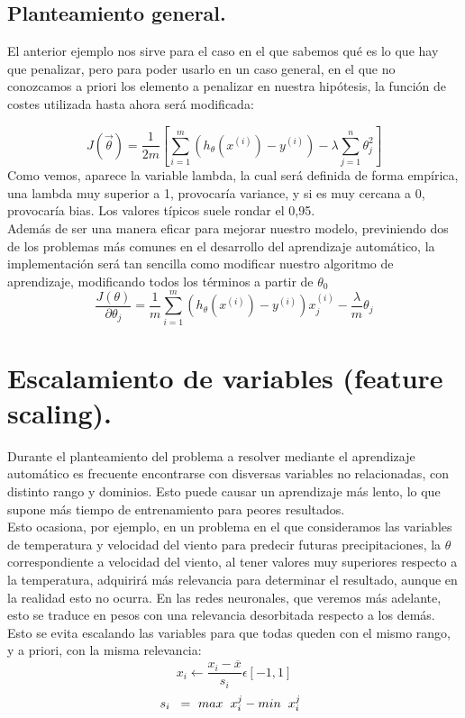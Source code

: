 \documentclass[a4paper,10pt]{article}
\begin{document}
\subsection{Planteamiento general.}
\noindent
El anterior ejemplo nos sirve para el caso en el que sabemos qué es lo que hay que penalizar, pero para poder usarlo en un caso general, en el que no conozcamos a priori los elemento a penalizar en nuestra hipótesis, la función de costes utilizada hasta ahora será modificada:

\[
J(\vec{\theta})=\frac{1}{2m}\left[\sum_{i=1}^{m} \left(h_\theta (x^{(i)})-y^{(i)}\right)-\lambda \sum_{j=1}^{n}\theta_{j}^2\right]
\]
Como vemos, aparece la variable lambda, la cual será definida de forma empírica, una lambda muy superior a 1, provocaría variance, y si es muy cercana a 0, provocaría bias. Los valores típicos suele rondar el 0,95.\\
Además de ser una manera eficar para mejorar nuestro modelo, previniendo dos de los problemas más comunes en el desarrollo del aprendizaje automático, la implementación será tan sencilla como modificar nuestro algoritmo de aprendizaje, modificando todos los términos a partir de $\theta_0$ \\
\[
\frac{J(\theta)}{\partial\theta_j} = \frac{1}{m} \sum_{i=1}^{m} \left(h_\theta (x^{(i)})-y^{(i)}\right) x_{j}^{(i)}-\frac{\lambda}{m} \theta_j 
\]
\section{Escalamiento de variables (feature scaling).}
\noindent
Durante el planteamiento del problema a resolver mediante el aprendizaje automático es frecuente encontrarse con disversas variables no relacionadas, con distinto rango y dominios. Esto puede causar un aprendizaje más lento, lo que supone más tiempo de entrenamiento para peores resultados. \\
Esto ocasiona, por ejemplo, en un problema en el que consideramos las variables de temperatura y velocidad del viento para predecir futuras precipitaciones, la $\theta$ correspondiente a  velocidad del viento, al tener valores muy superiores respecto a la temperatura, adquirirá más relevancia para determinar el resultado, aunque en la realidad esto no ocurra. En las redes neuronales, que veremos más adelante, esto se traduce en pesos con una relevancia desorbitada respecto a los demás.\\
Esto se evita escalando las variables para que todas queden con el mismo rango, y a priori, con la misma relevancia:
\[
x_i \longleftarrow \frac{x_i - \overline{x}}{s_i} \epsilon [-1,1]
\]
\hspace{0.20cm}
\[
s_i \hspace{0.20cm} = \  max\hspace{0.20cm}x_{i}^j -min\hspace{0.20cm}x_{i}^j \hspace{0.20cm}
\]
\newpage
\end{document}
